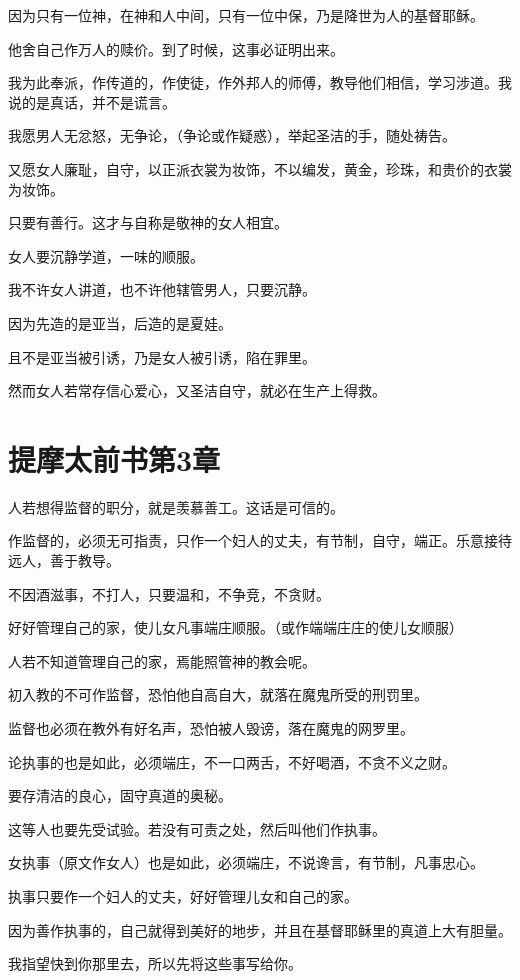 \documentclass[12pt,oneside]{book}
\begin{document}
因为只有一位神，在神和人中间，只有一位中保，乃是降世为人的基督耶稣。

他舍自己作万人的赎价。到了时候，这事必证明出来。

我为此奉派，作传道的，作使徒，作外邦人的师傅，教导他们相信，学习涉道。我说的是真话，并不是谎言。

我愿男人无忿怒，无争论，（争论或作疑惑），举起圣洁的手，随处祷告。

又愿女人廉耻，自守，以正派衣裳为妆饰，不以编发，黄金，珍珠，和贵价的衣裳为妆饰。

只要有善行。这才与自称是敬神的女人相宜。

女人要沉静学道，一味的顺服。

我不许女人讲道，也不许他辖管男人，只要沉静。

因为先造的是亚当，后造的是夏娃。

且不是亚当被引诱，乃是女人被引诱，陷在罪里。

然而女人若常存信心爱心，又圣洁自守，就必在生产上得救。

\chapter{提摩太前书第3章}
人若想得监督的职分，就是羡慕善工。这话是可信的。

作监督的，必须无可指责，只作一个妇人的丈夫，有节制，自守，端正。乐意接待远人，善于教导。

不因酒滋事，不打人，只要温和，不争竞，不贪财。

好好管理自己的家，使儿女凡事端庄顺服。（或作端端庄庄的使儿女顺服）

人若不知道管理自己的家，焉能照管神的教会呢。

初入教的不可作监督，恐怕他自高自大，就落在魔鬼所受的刑罚里。

监督也必须在教外有好名声，恐怕被人毁谤，落在魔鬼的网罗里。

论执事的也是如此，必须端庄，不一口两舌，不好喝酒，不贪不义之财。

要存清洁的良心，固守真道的奥秘。

这等人也要先受试验。若没有可责之处，然后叫他们作执事。

女执事（原文作女人）也是如此，必须端庄，不说谗言，有节制，凡事忠心。

执事只要作一个妇人的丈夫，好好管理儿女和自己的家。

因为善作执事的，自己就得到美好的地步，并且在基督耶稣里的真道上大有胆量。

我指望快到你那里去，所以先将这些事写给你。
\end{document}
